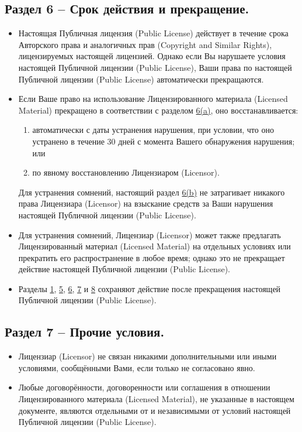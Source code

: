 \subsection*{Раздел 6 -- Срок действия и прекращение.}
\begin{itemize}
\item[a.] Настоящая Публичная лицензия (Public License) действует в течение срока Авторского права и аналогичных прав (Copyright and Similar Rights), лицензируемых настоящей лицензией. Однако если Вы нарушаете условия настоящей Публичной лицензии (Public License), Ваши права по настоящей Публичной лицензии (Public License) автоматически прекращаются.
\item[b.] Если Ваше право на использование Лицензированного материала (Licensed Material) прекращено в соответствии с разделом \href{https://creativecommons.org/licenses/by-nc-nd/4.0/legalcode#s6a}{6(a)}, оно восстанавливается:
	\begin{enumerate}
	\item автоматически с даты устранения нарушения, при условии, что оно устранено в течение 30 дней с момента Вашего обнаружения нарушения; или
	\item по явному восстановлению Лицензиаром (Licensor).
	\end{enumerate}
Для устранения сомнений, настоящий раздел \href{https://creativecommons.org/licenses/by-nc-nd/4.0/legalcode#s6b}{6(b)} не затрагивает никакого права Лицензиара (Licensor) на взыскание средств за Ваши нарушения настоящей Публичной лицензии (Public License).
\item[c.] Для устранения сомнений, Лицензиар (Licensor) может также предлагать Лицензированный материал (Licensed Material) на отдельных условиях или прекратить его распространение в любое время; однако это не прекращает действие настоящей Публичной лицензии (Public License).
\item[d.] Разделы \href{https://creativecommons.org/licenses/by-nc-nd/4.0/legalcode#s1}{1}, \href{https://creativecommons.org/licenses/by-nc-nd/4.0/legalcode#s5}{5}, \href{https://creativecommons.org/licenses/by-nc-nd/4.0/legalcode#s6}{6}, \href{https://creativecommons.org/licenses/by-nc-nd/4.0/legalcode#s7}{7} и \href{https://creativecommons.org/licenses/by-nc-nd/4.0/legalcode#s8}{8} сохраняют действие после прекращения настоящей Публичной лицензии (Public License).
\end{itemize}

\subsection*{Раздел 7 -- Прочие условия.}
\begin{itemize}
\item[a.] Лицензиар (Licensor) не связан никакими дополнительными или иными условиями, сообщёнными Вами, если только не согласовано явно.
\item[b.] Любые договорённости, договоренности или соглашения в отношении Лицензированного материала (Licensed Material), не указанные в настоящем документе, являются отдельными от и независимыми от условий настоящей Публичной лицензии (Public License).
\end{itemize}

